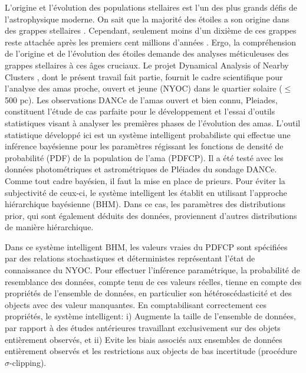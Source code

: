 

L'origine et l'évolution des populations stellaires est l'un des plus grands défis de l'astrophysique moderne. On sait que la majorité des étoiles a son origine dans des grappes stellaires \citep{2000AJ....120.3139C, 2003AJ....126.1916P,2003ARA&A..41...57L}. Cependant, seulement moins d'un dixième de ces grappes reste attachée après les premiers cent millions d'années \citep{2003ARA&A..41...57L}. Ergo, la compréhension de l'origine et de l'évolution des étoiles demande des analyses méticuleuses des grappes stellaires à ces âges cruciaux.
Le projet Dynamical Analysis of Nearby Clusters \cite[DANCe,][]{Bouy2013}, dont le présent travail fait partie, fournit le cadre scientifique pour l'analyse des amas proche, ouvert et jeune (NYOC) dans le quartier solaire ($\leq$ 500 pc). Les observations DANCe de l'amas ouvert et bien connu, Pleiades, constituent l'étude de cas parfaite pour le développement et l'essai d'outils statistiques visant à analyser les premières phases de l'évolution des amas.
L'outil statistique développé ici est un système intelligent probabiliste qui effectue une inférence bayésienne pour les paramètres régissant les fonctions de densité de probabilité (PDF) de la population de l'ama (PDFCP). Il a été testé avec les données photométriques et astrométriques de Pléiades du sondage DANCe. Comme tout cadre bayésien, il faut la mise en place de prieurs. Pour éviter la subjectivité de ceux-ci, le système intelligent les établit en utilisant l'approche hiérarchique bayésienne (BHM). Dans ce cas, les paramètres des distributions prior, qui sont également déduits des données, proviennent d'autres distributions de manière hiérarchique.

Dans ce système intelligent BHM, les valeurs vraies du PDFCP sont spécifiées par des relations stochastiques et déterministes représentant l'état de connaissance du NYOC. Pour effectuer l'inférence paramétrique, la probabilité de resemblance des données, compte tenu de ces valeurs réelles, tienne en compte des propriétés de l'ensemble de données, en particulier son hétéroscédasticité et des objects avec des valeur manquantes. En comptabilisant correctement ces propriétés, le système intelligent: i) Augmente la taille de l'ensemble de données, par rapport à des études antérieures travaillant exclusivement sur des objets entièrement observés, et ii) Evite les biais associés aux ensembles de données entièrement observés et les restrictions aux objects de bas incertitude (procédure $\sigma$-clipping).

